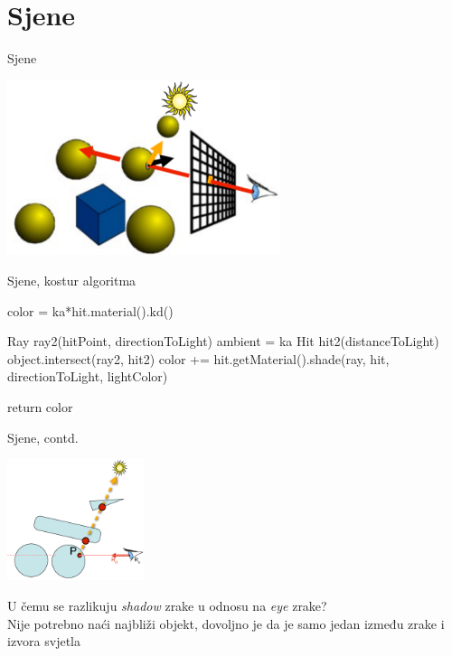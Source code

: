 \documentclass[9pt]{beamer}
\begin{document}
\section{Sjene}

\begin{frame}{Sjene}
\begin{center}
	\includegraphics[width=8cm]{slike/sjene_01.png}
\end{center}

\end{frame}

\begin{frame}{Sjene, kostur algoritma}
\begin{algorithm*}[H]
color = ka*hit.material().kd()\;
{
	Ray ray2(hitPoint, directionToLight)\;
	ambient = ka\;
	Hit hit2(distanceToLight)\;
	{
		object.intersect(ray2, hit2)\;
		{
			color += hit.getMaterial().shade(ray, hit, directionToLight, lightColor)\;
		}
	}
	
}
return color\;
\end{algorithm*}
\end{frame}

\begin{frame}{Sjene, contd.}
\begin{center}
\includegraphics[width=4cm]{slike/sjene_02.png}
\end{center}
U čemu se razlikuju \textit{shadow} zrake u odnosu na \textit{eye} zrake?\\
Nije potrebno naći najbliži objekt, dovoljno je da je samo jedan između zrake i izvora svjetla 
\end{frame}
\end{document}
